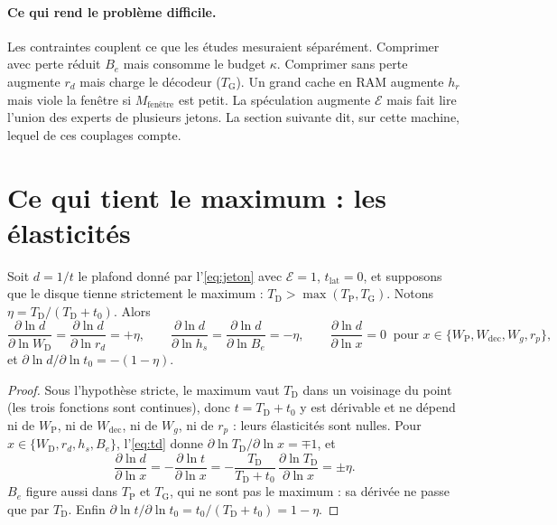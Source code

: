 \paragraph{Ce qui rend le problème difficile.} Les contraintes couplent ce que les études mesuraient séparément. Comprimer avec perte réduit $B_e$ mais consomme le budget $\kappa$. Comprimer sans perte augmente $r_d$ mais charge le décodeur ($T_{\mathrm{G}}$). Un grand cache en RAM augmente $h_r$ mais viole la fenêtre si $M_{\text{fenêtre}}$ est petit. La spéculation augmente $\mathcal E$ mais fait lire l'union des experts de plusieurs jetons. La section suivante dit, sur cette machine, lequel de ces couplages compte.

\section{Ce qui tient le maximum : les élasticités}\label{sec:elasticites}

\begin{proposition}\label{prop:elasticites}
Soit $d = 1/t$ le plafond donné par l'\cref{eq:jeton} avec $\mathcal E = 1$, $t_{\mathrm{lat}} = 0$, et supposons que le disque tienne strictement le maximum : $T_{\mathrm{D}} > \max(T_{\mathrm{P}}, T_{\mathrm{G}})$. Notons $\eta = T_{\mathrm{D}} / (T_{\mathrm{D}} + t_0)$. Alors
\begin{equation}\label{eq:elasticites}
\frac{\partial \ln d}{\partial \ln W_{\mathrm{D}}} = \frac{\partial \ln d}{\partial \ln r_d} = +\eta, \qquad
\frac{\partial \ln d}{\partial \ln h_s} = \frac{\partial \ln d}{\partial \ln B_e} = -\eta, \qquad
\frac{\partial \ln d}{\partial \ln x} = 0 \;\; \text{pour } x \in \{W_{\mathrm{P}}, W_{\mathrm{dec}}, W_g, r_p\},
\end{equation}
et $\partial \ln d / \partial \ln t_0 = -(1 - \eta)$.
\end{proposition}

\begin{proof}
Sous l'hypothèse stricte, le maximum vaut $T_{\mathrm{D}}$ dans un voisinage du point (les trois fonctions sont continues), donc $t = T_{\mathrm{D}} + t_0$ y est dérivable et ne dépend ni de $W_{\mathrm{P}}$, ni de $W_{\mathrm{dec}}$, ni de $W_g$, ni de $r_p$ : leurs élasticités sont nulles. Pour $x \in \{W_{\mathrm{D}}, r_d, h_s, B_e\}$, l'\cref{eq:td} donne $\partial \ln T_{\mathrm{D}} / \partial \ln x = \mp 1$, et
\[
\frac{\partial \ln d}{\partial \ln x} = -\frac{\partial \ln t}{\partial \ln x} = -\frac{T_{\mathrm{D}}}{T_{\mathrm{D}} + t_0}\,\frac{\partial \ln T_{\mathrm{D}}}{\partial \ln x} = \pm \eta .
\]
$B_e$ figure aussi dans $T_{\mathrm{P}}$ et $T_{\mathrm{G}}$, qui ne sont pas le maximum : sa dérivée ne passe que par $T_{\mathrm{D}}$. Enfin $\partial \ln t / \partial \ln t_0 = t_0 / (T_{\mathrm{D}} + t_0) = 1 - \eta$.
\end{proof}

